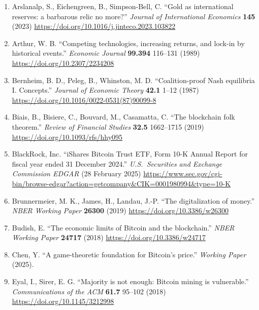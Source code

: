 \documentclass[12pt]{article}
\theoremstyle{definition}
\theoremstyle{remark}
\begin{document}
\begin{enumerate}[leftmargin=*,labelsep=0.5em,label=\arabic*.]

\item Arslanalp, S., Eichengreen, B., Simpson-Bell, C. ``Gold as
international reserves: a barbarous relic no more?'' \emph{Journal of
International Economics} \textbf{145} (2023)
\url{https://doi.org/10.1016/j.jinteco.2023.103822}

\item Arthur, W. B. ``Competing technologies, increasing returns,
and lock-in by historical events.'' \emph{Economic Journal}
\textbf{99.394} 116--131 (1989)
\url{https://doi.org/10.2307/2234208}

\item Bernheim, B. D., Peleg, B., Whinston, M. D.
``Coalition-proof Nash equilibria I. Concepts.'' \emph{Journal of
Economic Theory} \textbf{42.1} 1--12 (1987)
\url{https://doi.org/10.1016/0022-0531(87)90099-8}

\item Biais, B., Bisiere, C., Bouvard, M., Casamatta, C. ``The
blockchain folk theorem.'' \emph{Review of Financial Studies}
\textbf{32.5} 1662--1715 (2019)
\url{https://doi.org/10.1093/rfs/hhy095}

\item BlackRock, Inc. ``iShares Bitcoin Trust ETF, Form 10-K
Annual Report for fiscal year ended 31 December 2024.''
\emph{U.S.\ Securities and Exchange Commission EDGAR}
(28 February 2025)
\url{https://www.sec.gov/cgi-bin/browse-edgar?action=getcompany&CIK=0001980994&type=10-K}

\item Brunnermeier, M. K., James, H., Landau, J.-P. ``The
digitalization of money.'' \emph{NBER Working Paper}
\textbf{26300} (2019) \url{https://doi.org/10.3386/w26300}

\item Budish, E. ``The economic limits of Bitcoin and the
blockchain.'' \emph{NBER Working Paper} \textbf{24717} (2018)
\url{https://doi.org/10.3386/w24717}

\item Chen, Y. ``A game-theoretic foundation for Bitcoin's
price.'' \emph{Working Paper} (2025).

\item Eyal, I., Sirer, E. G. ``Majority is not enough: Bitcoin
mining is vulnerable.'' \emph{Communications of the ACM}
\textbf{61.7} 95--102 (2018)
\url{https://doi.org/10.1145/3212998}


\end{enumerate}
\end{document}

